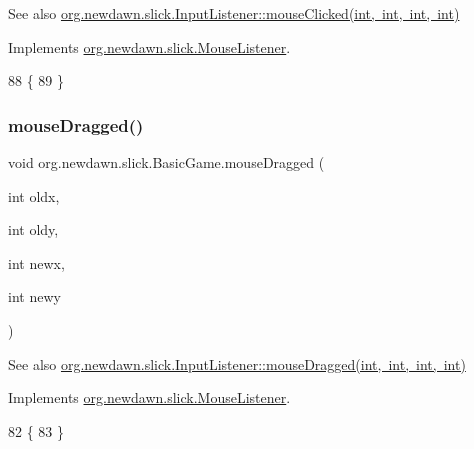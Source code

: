 \begin{DoxySeeAlso}{See also}
\mbox{\hyperlink{interfaceorg_1_1newdawn_1_1slick_1_1_mouse_listener_a3e42b74c252ecdc7418b0ee8bcae5510}{org.\+newdawn.\+slick.\+Input\+Listener\+::mouse\+Clicked(int, int, int, int)}} 
\end{DoxySeeAlso}


Implements \mbox{\hyperlink{interfaceorg_1_1newdawn_1_1slick_1_1_mouse_listener_a3e42b74c252ecdc7418b0ee8bcae5510}{org.\+newdawn.\+slick.\+Mouse\+Listener}}.


\begin{DoxyCode}
88                                                                        \{
89     \}
\end{DoxyCode}
\mbox{\label{classorg_1_1newdawn_1_1slick_1_1_basic_game_a1df1a7ae6bfdace7dcf780fe76f920a3}} 
\subsubsection{\texorpdfstring{mouse\+Dragged()}{mouseDragged()}}
{\footnotesize\ttfamily void org.\+newdawn.\+slick.\+Basic\+Game.\+mouse\+Dragged (\begin{DoxyParamCaption}\item[{int}]{oldx,  }\item[{int}]{oldy,  }\item[{int}]{newx,  }\item[{int}]{newy }\end{DoxyParamCaption})\hspace{0.3cm}{\ttfamily [inline]}}

\begin{DoxySeeAlso}{See also}
\mbox{\hyperlink{interfaceorg_1_1newdawn_1_1slick_1_1_mouse_listener_a65022dd6acb492caa47dfd806b207139}{org.\+newdawn.\+slick.\+Input\+Listener\+::mouse\+Dragged(int, int, int, int)}} 
\end{DoxySeeAlso}


Implements \mbox{\hyperlink{interfaceorg_1_1newdawn_1_1slick_1_1_mouse_listener_a65022dd6acb492caa47dfd806b207139}{org.\+newdawn.\+slick.\+Mouse\+Listener}}.


\begin{DoxyCode}
82                                                                      \{
83     \}
\end{DoxyCode}
\mbox{\label{classorg_1_1newdawn_1_1slick_1_1_basic_game_adaed74556aba405022579f9369f042eb}} 
